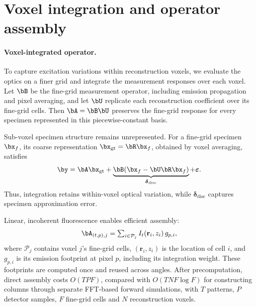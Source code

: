 \section{Voxel integration and operator assembly}
\label{sec:s:assembly}

\paragraph{Voxel-integrated operator.}
To capture excitation variations within reconstruction voxels, we evaluate the optics on a finer grid and integrate the measurement responses over each voxel. Let $\bB$ be the fine-grid measurement operator, including emission propagation and pixel averaging, and let $\bU$ replicate each reconstruction coefficient over its fine-grid cells. Then $\bA=\bB\bU$ preserves the fine-grid response for every specimen represented in this piecewise-constant basis.

Sub-voxel specimen structure remains unrepresented. For a fine-grid specimen $\bx_f$, its coarse representation $\bx_{\mathrm{gt}}=\bR\bx_f$, obtained by voxel averaging, satisfies
\begin{equation}
\by=\bA\bx_{\mathrm{gt}}
+\underbrace{\bB(\bx_f-\bU\bR\bx_f)}_{\boldsymbol\delta_{\mathrm{disc}}}
+\boldsymbol\varepsilon.
\label{eq:patch}
\end{equation}
Thus, integration retains within-voxel optical variation, while $\boldsymbol\delta_{\mathrm{disc}}$ captures specimen approximation error.

Linear, incoherent fluorescence enables efficient assembly:
\begin{equation}
\bA_{(t,p),j}=\textstyle\sum_{i\in\mathcal P_j} I_t(\mathbf r_i,z_i)\,g_{p,i},
\label{eq:factor}
\end{equation}
where $\mathcal P_j$ contains voxel $j$'s fine-grid cells, $(\mathbf r_i,z_i)$ is the location of cell $i$, and $g_{p,i}$ is its emission footprint at pixel $p$, including its integration weight. These footprints are computed once and reused across angles. After precomputation, direct assembly costs $O(TPF)$, compared with $O(TNF\log F)$ for constructing columns through separate FFT-based forward simulations, with $T$ patterns, $P$ detector samples, $F$ fine-grid cells and $N$ reconstruction voxels.

